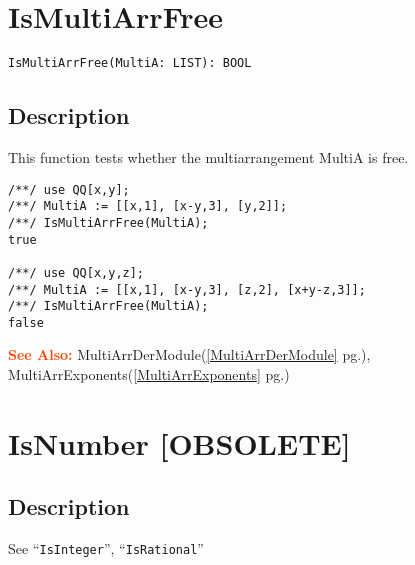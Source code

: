 \documentclass[a4paper]{mybook}
\newenvironment{command}{}{} %
\newcommand\SeeAlso{\par\textcolor{OrangeRed}{\textbf{\large See Also: }}}
\begin{document}
\section{IsMultiArrFree}
\label{IsMultiArrFree}
\begin{command} %


\begin{Verbatim}[label=syntax, rulecolor=\color{MidnightBlue},
frame=single]
IsMultiArrFree(MultiA: LIST): BOOL 
\end{Verbatim}


\subsection*{Description}

This function tests whether the multiarrangement MultiA is free.
\begin{Verbatim}[label=example, rulecolor=\color{PineGreen}, frame=single]
/**/ use QQ[x,y];	
/**/ MultiA := [[x,1], [x-y,3], [y,2]];
/**/ IsMultiArrFree(MultiA);    
true

/**/ use QQ[x,y,z];	
/**/ MultiA := [[x,1], [x-y,3], [z,2], [x+y-z,3]];
/**/ IsMultiArrFree(MultiA);    
false
\end{Verbatim}


\SeeAlso %
  MultiArrDerModule(\ref{MultiArrDerModule} pg.\pageref{MultiArrDerModule}), 
    MultiArrExponents(\ref{MultiArrExponents} pg.\pageref{MultiArrExponents})
\end{command} %

\section{IsNumber [OBSOLETE]}
\label{IsNumber [OBSOLETE]}
\begin{command} %



\subsection*{Description}

See ``\verb&IsInteger&'', ``\verb&IsRational&''

\end{command} %
\end{document}
